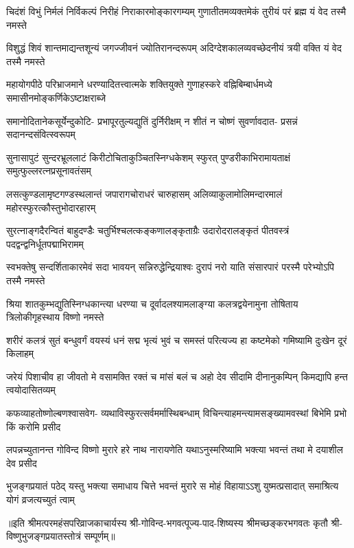
\begin{AutoCols}[\maxColumns]
\fourlineindentedshloka
{चिदंशं विभुं निर्मलं निर्विकल्पं}
{निरीहं निराकारमोङ्कारगम्यम्}
{गुणातीतमव्यक्तमेकं तुरीयं}
{परं ब्रह्म यं वेद तस्मै नमस्ते}%

\fourlineindentedshloka
{विशुद्धं शिवं शान्तमाद्यन्तशून्यं}
{जगज्जीवनं ज्योतिरानन्दरूपम्}
{अदिग्देशकालव्यवच्छेदनीयं}
{त्रयी वक्ति यं वेद तस्मै नमस्ते}%

\fourlineindentedshloka
{महायोगपीठे परिभ्राजमाने}
{धरण्यादितत्त्वात्मके शक्तियुक्ते}
{गुणाहस्करे वह्निबिम्बार्धमध्ये}
{समासीनमोङ्कर्णिकेऽष्टाक्षराब्जे}%

\fourlineindentedshloka
{समानोदितानेकसूर्येन्दुकोटि-}
{प्रभापूरतुल्यद्युतिं दुर्निरीक्षम्}
{न शीतं न चोष्णं सुवर्णावदात-}
{प्रसन्नं सदानन्दसंवित्स्वरूपम्}%

\fourlineindentedshloka
{सुनासापुटं सुन्दरभ्रूललाटं}
{किरीटोचिताकुञ्चितस्निग्धकेशम्}
{स्फुरत् पुण्डरीकाभिरामायताक्षं}
{समुत्फुल्लरत्नप्रसूनावतंसम्}%

\fourlineindentedshloka
{लसत्कुण्डलामृष्टगण्डस्थलान्तं}
{जपारागचोराधरं चारुहासम्}
{अलिव्याकुलामोलिमन्दारमालं}
{महोरस्फुरत्कौस्तुभोदारहारम्}%

\fourlineindentedshloka
{सुरत्नाङ्गदैरन्वितं बाहुदण्डैः}
{चतुर्भिश्चलत्कङ्कणालङ्कृताग्रैः}
{उदारोदरालङ्कृतं पीतवस्त्रं}
{पदद्वन्द्वनिर्धूतपद्माभिरामम्}%

\fourlineindentedshloka
{स्वभक्तेषु सन्दर्शिताकारमेवं}
{सदा भावयन् सन्निरुद्धेन्द्रियाश्वः}
{दुरापं नरो याति संसारपारं}
{परस्मै परेभ्योऽपि तस्मै नमस्ते}%

\fourlineindentedshloka
{श्रिया शातकुम्भद्युतिस्निग्धकान्त्या}
{धरण्या च दूर्वादलश्यामलाङ्ग्या}
{कलत्रद्वयेनामुना तोषिताय}
{त्रिलोकीगृहस्थाय विष्णो नमस्ते}%

\fourlineindentedshloka
{शरीरं कलत्रं सुतं बन्धुवर्गं}
{वयस्यं धनं सद्म भृत्यं भुवं च}
{समस्तं परित्यज्य हा कष्टमेको}
{गमिष्यामि दुःखेन दूरं किलाहम्}%

\fourlineindentedshloka
{जरेयं पिशाचीव हा जीवतो मे}
{वसामक्ति रक्तं च मांसं बलं च}
{अहो देव सीदामि दीनानुकम्पिन्}
{किमद्यापि हन्त त्वयोदासितव्यम्}%

\fourlineindentedshloka
{कफव्याहतोष्णोल्बणश्वासवेग-}
{व्यथाविस्फुरत्सर्वमर्मास्थिबन्धाम्}
{विचिन्त्याहमन्त्यामसङ्ख्यामवस्थां}
{बिभेमि प्रभो किं करोमि प्रसीद}%

\fourlineindentedshloka
{लपन्नच्युतानन्त गोविन्द विष्णो}
{मुरारे हरे नाथ नारायणेति}
{यथाऽनुस्मरिष्यामि भक्त्या भवन्तं}
{तथा मे दयाशील देव प्रसीद}%

\fourlineindentedshloka
{भुजङ्गप्रयातं पठेद् यस्तु भक्त्या}
{समाधाय चित्ते भवन्तं मुरारे}
{स मोहं विहायाऽऽशु युष्मत्प्रसादात्}
{समाश्रित्य योगं व्रजत्यच्युतं त्वाम्}%
\end{AutoCols}

॥इति श्रीमत्परमहंसपरिव्राजकाचार्यस्य श्री-गोविन्द-भगवत्पूज्य-पाद-शिष्यस्य
श्रीमच्छङ्करभगवतः कृतौ श्री-विष्णुभुजङ्गप्रयातस्तोत्रं सम्पूर्णम्‌॥

